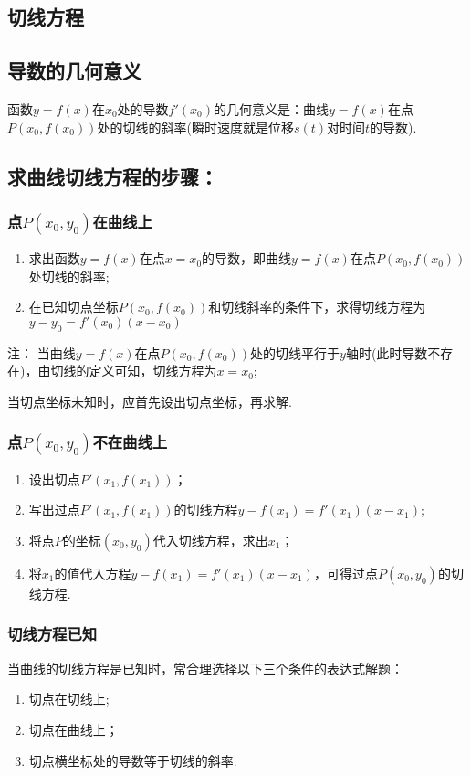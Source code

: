   \subsection{切线方程}
  \subsection{导数的几何意义}
    {\kaishu 函数$y=f(x)$在$x_0$处的导数$ f'(x_0) $的几何意义是：曲线$y=f(x)$在点$ P(x_0,f(x_0)) $处的切线的斜率(瞬时速度就是位移$ s(t) $对时间$ t $的导数).}\par
  \subsection{求曲线切线方程的步骤：}
    \subsubsection{点$ P(x_0,y_0) $在曲线上}
      {\kaishu \begin{enumerate}[(1)]
      \item 求出函数$y= f(x) $在点$ x=x_0 $的导数，即曲线$y=f(x)$在点$ P(x_0,f(x_0)) $处切线的斜率;
      \item 在已知切点坐标$ P(x_0,f(x_0)) $和切线斜率的条件下，求得切线方程为$ y-y_0=f'(x_0)(x-x_0) $
      \end{enumerate}
      注： 当曲线$y=f(x)$在点$ P(x_0,f(x_0)) $处的切线平行于$y$轴时(此时导数不存在)，由切线的定义可知，切线方程为$ x=x_0 $;\par
       当切点坐标未知时，应首先设出切点坐标，再求解.}
    \subsubsection{点$ P(x_0,y_0) $不在曲线上}
      {\kaishu \begin{enumerate}[1)]
      \item 设出切点$P'\left(x_1,f\left(x_1\right)\right)$；
      \item 写出过点$P'\left(x_1,f\left(x_1\right)\right)$的切线方程$ y-f\left(x_1\right)=f'\left(x_1\right)(x-x_1) $;
      \item 将点$ P $的坐标$ \left(x_0,y_0\right) $代入切线方程，求出$ x_1 $；
      \item 将$ x_1 $的值代入方程$y-f\left(x_1\right)=f'\left(x_1\right)(x-x_1) $，可得过点$ P(x_0,y_0) $的切线方程.
      \end{enumerate}}
    \subsubsection{切线方程已知}
      当曲线的切线方程是已知时，常合理选择以下三个条件的表达式解题：
      {\kaishu \begin{enumerate}[1)]
        \item 切点在切线上;
        \item 切点在曲线上；
        \item 切点横坐标处的导数等于切线的斜率.
      \end{enumerate}
    }
